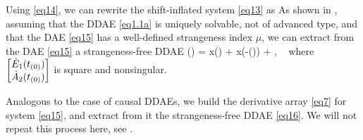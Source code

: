 \documentclass[final,reqno]{siamltex}
\begin{document}
Using \eqref{eq14}, we can rewrite the shift-inflated system \eqref{eq13} as
%
\be\label{eq15}
\ee
%
As shown in \cite{HaM14}, assuming that the DDAE \eqref{eq1.1a} is uniquely solvable, not of advanced type, and that the DAE \eqref{eq15}
has a well-defined strangeness index $\mu$, we can extract from the DAE \eqref{eq15} a strangeness-free DDAE
%
\be\label{eq16}
  () \!=\!  x() \!+\!
  x(-\tau()) \!+\! , \ %
\ee
%
where $\begin{bmatrix} \hat{E}_{1}(t_{(0)}) \\ \hat{A}_{2}(t_{(0)}) \end{bmatrix}$ is square and nonsingular.

Analogous to the case of causal DDAEs, we build the derivative array \eqref{eq7} for system \eqref{eq15}, and extract from it the
strangeness-free DDAE \eqref{eq16}. We will not repeat this process here, see \cite{HaM14}.
\end{document}
